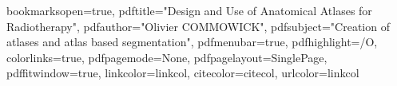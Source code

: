 

\hypersetup
{
bookmarksopen=true,
pdftitle="Design and Use of Anatomical Atlases for Radiotherapy",
pdfauthor="Olivier COMMOWICK", 
pdfsubject="Creation of atlases and atlas based segmentation", %
pdfmenubar=true, %
pdfhighlight=/O, %
colorlinks=true, %
pdfpagemode=None, %
pdfpagelayout=SinglePage, %
pdffitwindow=true, %
linkcolor=linkcol, %
citecolor=citecol, %
urlcolor=linkcol %
}
\usepackage{forest} 
\usepackage[linesnumbered,ruled,vlined]{algorithm2e}

\setcounter{secnumdepth}{3}
\setcounter{tocdepth}{2}


\newcommand{\pd}[2]{\frac{\partial #1}{\partial #2}}
\def\abs{\operatorname{abs}}
\def\argmax{\operatornamewithlimits{arg\,max}}
\def\argmin{\operatornamewithlimits{arg\,min}}
\def\diag{\operatorname{Diag}}
\newcommand{\eqRef}[1]{(\ref{#1})}

\usepackage{rotating}                    %
\usepackage{fancyhdr}                    %

  

\pagestyle{fancy}                       %
\fancyfoot{}                            %


